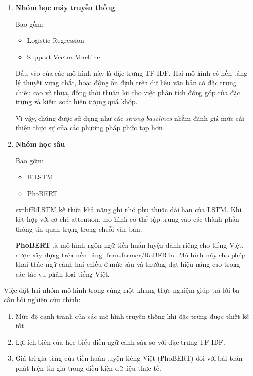 \documentclass[12pt, a4paper]{report}
\begin{document}
\begin{enumerate}
    \item \textbf{Nhóm học máy truyền thống}

    Bao gồm:
    \begin{itemize}
        \item Logistic Regression
        \item Support Vector Machine
    \end{itemize}

    Đầu vào của các mô hình này là đặc trưng TF-IDF.
    Hai mô hình có nền tảng lý thuyết vững chắc, hoạt động ổn định trên dữ
    liệu văn bản có đặc trưng chiều cao và thưa, đồng thời thuận lợi cho việc
    phân tích đóng góp của đặc trưng và kiểm soát hiện tượng quá khớp.

    Vì vậy, chúng được sử dụng như các \textit{strong baselines} nhằm đánh
    giá mức cải thiện thực sự của các phương pháp phức tạp hơn.

    \item \textbf{Nhóm học sâu}

    Bao gồm:
    \begin{itemize}
        \item BiLSTM
        \item PhoBERT
    \end{itemize}

  	extbf{BiLSTM} kế thừa khả năng ghi nhớ phụ thuộc dài hạn của
  LSTM. Khi kết hợp với cơ chế attention,
    mô hình có thể tập trung vào các thành phần thông tin quan trọng
    trong chuỗi văn bản.

    \textbf{PhoBERT} là mô hình ngôn ngữ tiền huấn luyện dành riêng cho
    tiếng Việt, được xây dựng trên nền tảng Transformer/RoBERTa.
    Mô hình này
    cho phép khai thác ngữ cảnh hai chiều ở mức sâu và thường đạt hiệu
    năng cao trong các tác vụ phân loại tiếng Việt.
\end{enumerate}

Việc đặt hai nhóm mô hình trong cùng một khung thực nghiệm giúp trả lời
ba câu hỏi nghiên cứu chính:

\begin{enumerate}
    \item Mức độ cạnh tranh của các mô hình truyền thống khi đặc trưng
    được thiết kế tốt.
    \item Lợi ích biên của học biểu diễn ngữ cảnh sâu so với đặc trưng
    TF-IDF.
    \item Giá trị gia tăng của tiền huấn luyện tiếng Việt (PhoBERT)
    đối với bài toán phát hiện tin giả trong điều kiện dữ liệu thực tế.
\end{enumerate}
\end{document}
